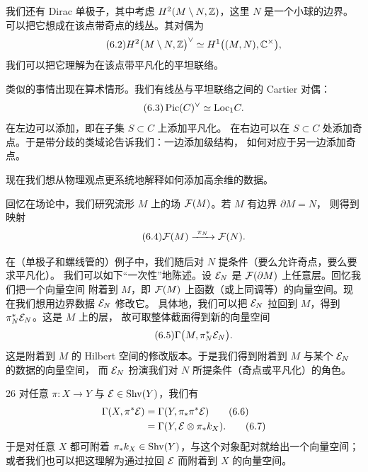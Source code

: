 我们还有 Dirac 单极子，其中考虑 $H^2(M\setminus N,\mathbb{Z})$，这里 $N$ 是一个小球的边界。
可以把它想成在该点带奇点的线丛。其对偶为
\begin{equation}\tag{6.2}\label{eq:6.2}
H^2\bigl(M\setminus N,\mathbb{Z}\bigr)^{\vee}\simeq H^1\bigl((M,N),\mathbb{C}^{\times}\bigr),
\end{equation}
我们可以把它理解为在该点带平凡化的平坦联络。

类似的事情出现在算术情形。我们有线丛与平坦联络之间的 Cartier 对偶：
\begin{equation}\tag{6.3}\label{eq:6.3}
\operatorname{Pic}(C)^{\vee}\simeq \mathrm{Loc}_1 C .
\end{equation}
在左边可以添加，即在子集 $S\subset C$ 上添加平凡化。
在右边可以在 $S\subset C$ 处添加奇点。于是带分歧的类域论告诉我们：一边添加级结构，
如何对应于另一边添加奇点。

现在我们想从物理观点更系统地解释如何添加高余维的数据。

回忆在场论中，我们研究流形 $M$ 上的场 $\mathcal{F}(M)$。若 $M$ 有边界 $\partial M=N$，
则得到映射
\begin{equation}\tag{6.4}\label{eq:6.4}
\mathcal{F}(M)\xrightarrow{\ \pi_N\ }\mathcal{F}(N).
\end{equation}


在（单极子和螺线管的）例子中，我们随后对 $N$ 提条件（要么允许奇点，要么要求平凡化）。
我们可以如下“一次性”地陈述。设 $\mathcal{E}_N$ 是 $\mathcal{F}(\partial M)$ 上任意层。回忆我们把一个向量空间
附着到 $M$，即 $\mathcal{F}(M)$ 上函数（或上同调等）的向量空间。现在我们想用边界数据 $\mathcal{E}_N$ 修改它。
具体地，我们可以把 $\mathcal{E}_N$ 拉回到 $M$，得到 $\pi_N^*\mathcal{E}_N$。这是 $M$ 上的层，
故可取整体截面得到新的向量空间
\begin{equation}\tag{6.5}\label{eq:6.5}
\Gamma\bigl(M,\pi_N^*\mathcal{E}_N\bigr).
\end{equation}
这是附着到 $M$ 的 Hilbert 空间的修改版本。于是我们得到附着到 $M$ 与某个 $\mathcal{E}_N$ 的数据的向量空间，
而 $\mathcal{E}_N$ 扮演我们对 $N$ 所提条件（奇点或平凡化）的角色。

\begin{srcrem}{26}
对任意 $\pi\colon X\to Y$ 与 $\mathcal{E}\in\mathrm{Shv}(Y)$，我们有
\begin{align}
\Gamma(X,\pi^*\mathcal{E})&=\Gamma(Y,\pi_*\pi^*\mathcal{E})\tag{6.6}\label{eq:6.6}\\
&=\Gamma(Y,\mathcal{E}\otimes\pi_*k_X).\tag{6.7}\label{eq:6.7}
\end{align}
于是对任意 $X$ 都可附着 $\pi_*k_X\in\mathrm{Shv}(Y)$，与这个对象配对就给出一个向量空间；
或者我们也可以把这理解为通过拉回 $\mathcal{E}$ 而附着到 $X$ 的向量空间。
\end{srcrem}

